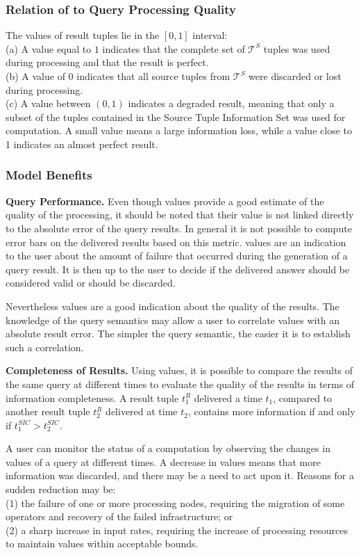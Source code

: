 \subsubsection*{Relation of \sic to Query Processing Quality} 
The \sic values of result tuples lie in the $[0,1]$ interval: \\
(a) A value equal to $1$ indicates that the complete set of $\mathcal{T}^{S}$ tuples was
used during processing and that the result is perfect. \\
(b) A value of $0$ indicates that all source tuples from $\mathcal{T}^{S}$
were discarded or lost during processing. \\  
(c) A value between $(0,1)$ indicates a degraded result, meaning that only a subset of the tuples
contained in the Source Tuple Information Set was used for computation. A small value means a
large information loss, while a value close to 1 indicates an almost perfect result. 
\subsubsection*{Model Benefits}

\textbf{Query Performance.} Even though \sic values provide a good estimate of the quality of the
processing, it should be noted that their value is not linked directly to the absolute error of the query
results. In general it is not possible to compute error bars on the delivered results based on this
metric.
\sic values are an indication to the user about the amount of failure that occurred during the generation
of a query result. It is then up to the user to decide if the delivered answer should be considered valid
or should be discarded. 

Nevertheless \sic values are a good indication about the quality of the results. The
knowledge of the query semantics may allow a user to correlate \sic values with an absolute result error. 
The simpler the query semantic, the easier it is to establish such a correlation. 

\textbf{Completeness of Results.} Using \sic values, it is possible to compare the results of the same
query at different times to evaluate the quality of the results in terms of information
completeness. A result tuple $t^R_1$ delivered a time $t_1$, compared to another result tuple $t^R_2$
delivered at time $t_2$, contains more information if and only if $t^{SIC}_1 > t^{SIC}_2$.

A user can monitor the status of a computation by observing the changes in \sic values of a
query at different times. A decrease in \sic values means that more information was
discarded, and there may be a need to act upon it. Reasons for a sudden reduction may be:\\
(1) the failure of one or more processing nodes, requiring the migration of some operators and
recovery of the failed infrastructure; or\\
(2) a sharp increase in input rates, requiring the increase of processing resources to maintain \sic
values within acceptable bounds.

